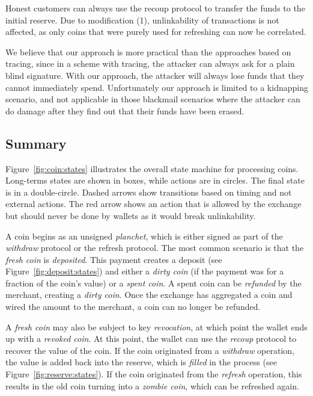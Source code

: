 Honest customers can always use the recoup protocol to transfer the funds to
the initial reserve.  Due to modification (1), unlinkability of transactions is
not affected, as only coins that were purely used for refreshing can now be
correlated.

We believe that our approach is more practical than the approaches based on
tracing, since in a scheme with tracing, the attacker can always ask for a
plain blind signature.  With our approach, the attacker will always lose funds
that they cannot immediately spend.  Unfortunately our approach is limited to a
kidnapping scenario, and not applicable in those blackmail scenarios where the
attacker can do damage after they find out that their funds have been erased.

\subsection{Summary}

Figure~\ref{fig:coin:states} illustrates the overall state machine for processing
coins.  Long-terms states are shown in boxes, while actions are in circles.
The final state is in a double-circle.  Dashed arrows show transitions based
on timing and not external actions. The red arrow shows an action that is
allowed by the exchange but should never be done by wallets as it would
break unlinkability.

A coin begins as an unsigned {\em planchet}, which is either signed as part of
the {\em withdraw} protocol or the refresh protocol. The most common scenario
is that the {\em fresh coin} is {\em deposited}. This payment creates a
deposit (see Figure~\ref{fig:deposit:states}) and either a {\em dirty coin}
(if the payment was for a fraction of the coin's value) or a {\em spent coin}.
A spent coin can be {\em refunded} by the merchant, creating a {\em dirty
  coin}. Once the exchange has aggregated a coin and wired the amount to the
merchant, a coin can no longer be refunded.

A {\em fresh coin} may also be subject to key {\em revocation}, at which point
the wallet ends up with a {\em revoked coin}.  At this point, the wallet can
use the {\em recoup} protocol to recover the value of the coin.  If the coin
originated from a {\em withdraw} operation, the value is added back into the
reserve, which is {\em filled} in the process (see
Figure~\ref{fig:reserve:states}).  If the coin originated from the {\em
  refresh} operation, this results in the old coin turning into a {\em zombie
  coin}, which can be refreshed again.

